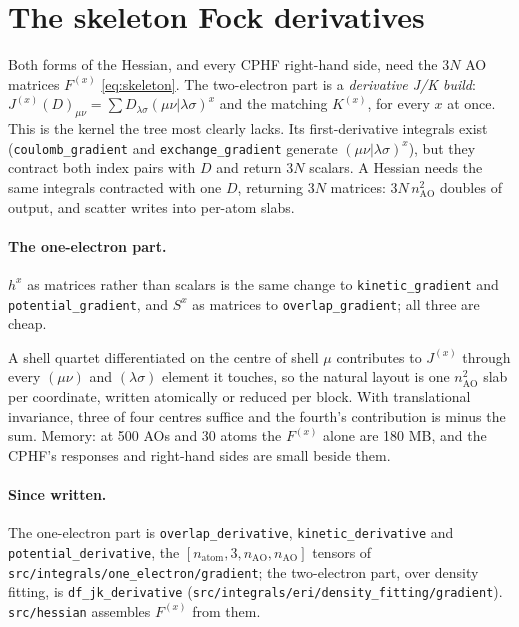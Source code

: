 \documentclass[11pt]{article}
\newcommand{\code}[1]{\texttt{#1}}
\newcommand{\Fsk}[1]{F^{(#1)}}
\begin{document}
\section{The skeleton Fock derivatives}
\label{sec:skeleton}

Both forms of the Hessian, and every CPHF right-hand side, need the $3N$
AO matrices $\Fsk{x}$ \eqref{eq:skeleton}. The two-electron part is a
\emph{derivative J/K build}: $J^{(x)}(D)_{\mu\nu} = \sum D_{\lambda\sigma}
(\mu\nu|\lambda\sigma)^x$ and the matching $K^{(x)}$, for every $x$ at
once. This is the kernel the tree most clearly lacks. Its first-derivative
integrals exist (\code{coulomb\_gradient} and \code{exchange\_gradient}
generate $(\mu\nu|\lambda\sigma)^x$), but they contract both index pairs
with $D$ and return $3N$ scalars. A Hessian needs the same integrals
contracted with one $D$, returning $3N$ matrices: $3N\,n_{\mathrm{AO}}^2$
doubles of output, and scatter writes into per-atom slabs.

\paragraph{The one-electron part.} $h^x$ as matrices rather than scalars is
the same change to \code{kinetic\_gradient} and \code{potential\_gradient},
and $S^x$ as matrices to \code{overlap\_gradient}; all three are cheap.

A shell quartet differentiated on the centre of shell $\mu$ contributes to
$J^{(x)}$ through every $(\mu\nu)$ and $(\lambda\sigma)$ element it
touches, so the natural layout is one $n_{\mathrm{AO}}^2$ slab per
coordinate, written atomically or reduced per block. With translational
invariance, three of four centres suffice and the fourth's contribution is
minus the sum. Memory: at 500 AOs and 30 atoms the $\Fsk{x}$ alone are
180 MB, and the CPHF's responses and right-hand sides are small beside
them.

\paragraph{Since written.} The one-electron part is
\code{overlap\_derivative}, \code{kinetic\_derivative} and
\code{potential\_derivative}, the $[n_{\mathrm{atom}}, 3, n_{\mathrm{AO}},
n_{\mathrm{AO}}]$ tensors of \code{src/integrals/one\_electron/gradient};
the two-electron part, over density fitting, is \code{df\_jk\_derivative}
(\code{src/integrals/eri/density\_fitting/gradient}). \code{src/hessian}
assembles $\Fsk{x}$ from them.
\end{document}

